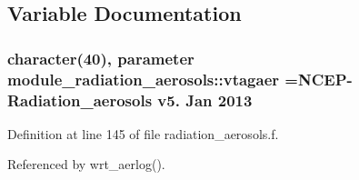 \subsection{Variable Documentation}
\subsubsection[{\texorpdfstring{vtagaer}{vtagaer}}]{\setlength{\rightskip}{0pt plus 5cm}character(40), parameter module\+\_\+radiation\+\_\+aerosols\+::vtagaer =\textquotesingle{}N\+C\+EP-\/Radiation\+\_\+aerosols v5. Jan 2013 \textquotesingle{}\hspace{0.3cm}{\ttfamily [private]}}\hypertarget{namespacemodule__radiation__aerosols_a6d0e0cbcb4a13c1f80f6b1c41b13d3b8}{}\label{namespacemodule__radiation__aerosols_a6d0e0cbcb4a13c1f80f6b1c41b13d3b8}


Definition at line 145 of file radiation\+\_\+aerosols.\+f.



Referenced by wrt\+\_\+aerlog().

